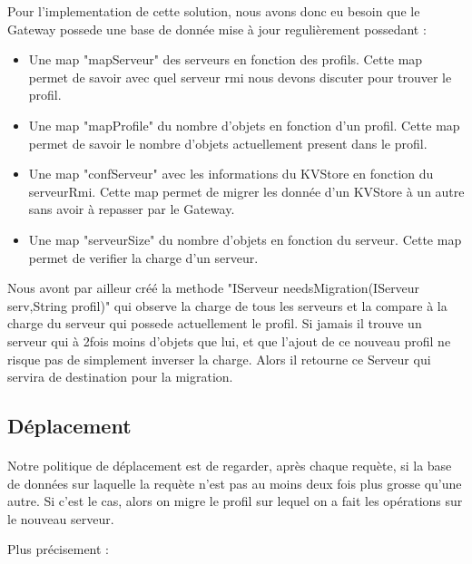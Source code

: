 Pour l'implementation de cette solution, nous avons donc eu besoin que le Gateway possede une base de donnée mise à jour regulièrement possedant :
\begin{itemize}
\item Une map "mapServeur" des serveurs en fonction des profils. Cette map permet de savoir avec quel serveur rmi nous devons discuter pour trouver le profil.
\item Une map "mapProfile" du nombre d'objets en fonction d'un profil. Cette map permet de savoir le nombre d'objets actuellement present dans le profil.
\item Une map "confServeur" avec les informations du KVStore en fonction du serveurRmi. Cette map permet de migrer les donnée d'un KVStore à un autre sans avoir à repasser par le Gateway.
\item Une map "serveurSize" du nombre d'objets en fonction du serveur. Cette map permet de verifier la charge d'un serveur.
\end{itemize}

Nous avont par ailleur créé la methode "IServeur needsMigration(IServeur serv,String profil)" qui observe la charge de tous les serveurs et la compare à la charge du serveur qui possede actuellement le profil.
Si jamais il trouve un serveur qui à 2fois moins d'objets que lui, et que l'ajout de ce nouveau profil ne risque pas de simplement inverser la charge. Alors il retourne ce Serveur qui servira de destination pour la migration.

\subsection{Déplacement}

\paragraph{}
Notre politique de déplacement est de regarder, après chaque requète, si la base de données sur laquelle la requète n'est pas au moins deux fois plus grosse qu'une autre. Si c'est le cas, alors on migre le profil sur lequel on a fait les opérations sur le nouveau serveur.

Plus précisement :

